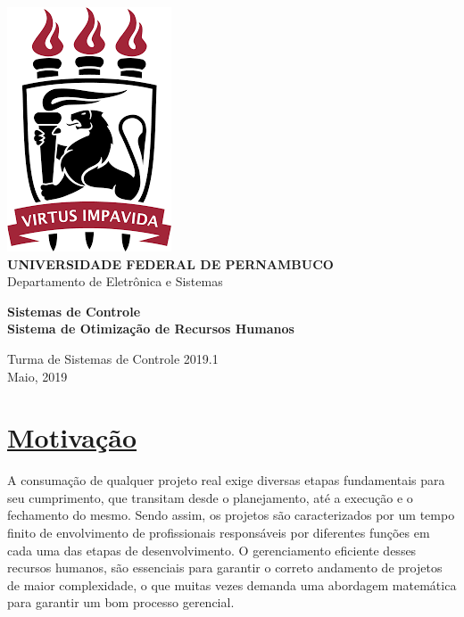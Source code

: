 \documentclass[14pt, oneside]{book}
\date{\vspace{-5ex}}
\theoremstyle{definition}
\begin{document}

    \begin{titlepage}
        \centering 
        \includegraphics[scale = 0.8]{ufpe.png} \\
        \Large{\textbf{UNIVERSIDADE FEDERAL DE PERNAMBUCO}}\\
        \large{Departamento de Eletrônica e Sistemas}
   
        \Huge\textbf{Sistemas de Controle}\\
        \Large\textbf{Sistema de Otimização de Recursos Humanos}
   
        \vfill
        \Large{Turma de Sistemas de Controle 2019.1} \\
        
        \Large{Maio, 2019}
    \end{titlepage}
\tableofcontents
{}
\mainmatter
            \chapter[Motivação]{\hyperlink{toc}{Motivação}}
    A consumação de qualquer projeto real exige diversas etapas fundamentais para seu cumprimento, que transitam desde o planejamento, até a execução e o fechamento do mesmo. Sendo assim, os projetos são caracterizados por um tempo finito de envolvimento de profissionais responsáveis por diferentes funções em cada uma das etapas de desenvolvimento. O gerenciamento eficiente desses recursos humanos, são essenciais para garantir o correto andamento de projetos de maior complexidade, o que muitas vezes demanda uma abordagem matemática para garantir um bom processo gerencial.\\
            
\end{document}
